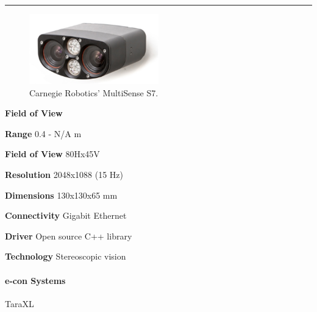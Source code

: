 \documentclass[../main.tex]{subfiles}
\begin{document}
\noindent\rule{8cm}{0.1pt}
\begin{figure}[H]
    \centering
    \includegraphics[width=0.5\textwidth]{images/multisenseS7.png}
    \caption{Carnegie Robotics' MultiSense S7.}
    \label{fig:multisenseS7}
\end{figure}
\begin{labeling}{\textbf{Field of View    }}
    \setlength{\itemindent}{2em}
    \item [\textbf{Range}] 0.4 - N/A m
    \item [\textbf{Field of View}] 80Hx45V
    \item [\textbf{Resolution}] 2048x1088 (15 Hz)
    \item [\textbf{Dimensions}] 130x130x65 mm
    \item [\textbf{Connectivity}] Gigabit Ethernet
    \item [\textbf{Driver}] Open source C++ library
    \item [\textbf{Technology}] Stereoscopic vision
\end{labeling}
\vspace{1em}
\paragraph{\large \textbf{e-con Systems}} {\large TaraXL}
\end{document}
